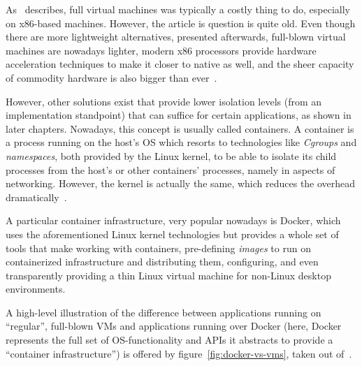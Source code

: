 As~\cite{introvirtualization} describes, full virtual machines was typically a costly thing to do, especially on x86-based machines.
However, the article is question is quite old.
Even though there are more lightweight alternatives, presented afterwards, full-blown virtual machines are nowadays lighter, modern x86 processors provide hardware acceleration techniques to make it closer to native as well, and the sheer capacity of commodity hardware is also bigger than ever~\cite{virtualizationcontainerization}.

However, other solutions exist that provide lower isolation levels (from an implementation standpoint) that can suffice for certain applications, as shown in later chapters. Nowadays, this concept is usually called containers.
A container is a process running on the host's OS which resorts to technologies like \emph{Cgroups} and \emph{namespaces}, both provided by the Linux kernel, to be able to isolate its child processes from the host's or other containers' processes, namely in aspects of networking.
However, the kernel is actually the same, which reduces the overhead dramatically~\cite{comparativevmscontainers}.

A particular container infrastructure, very popular nowadays is Docker, which uses the aforementioned Linux kernel technologies but provides a whole set of tools that make working with containers, pre-defining \emph{images} to run on containerized infrastructure and distributing them, configuring, and even transparently providing a thin Linux virtual machine for non-Linux desktop environments.

A high-level illustration of the difference between applications running on ``regular'', full-blown VMs and applications running over Docker (here, Docker represents the full set of OS-functionality and APIs it abstracts to provide a ``container infrastructure'') is offered by figure~\ref{fig:docker-vs-vms}, taken out of~\cite{dockercontreplacingvms}.




